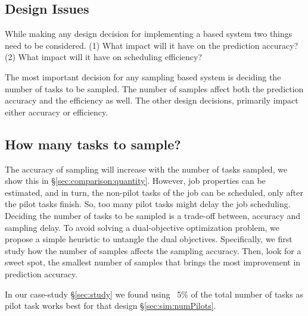 \subsection{Design Issues}
\label{sec:sampling:designissues}

While making any design decision for implementing a \lTechnique based system
two things need to be considered. (1) What impact will it have on the
prediction accuracy?  (2) What impact will it have on scheduling efficiency?

The most important decision for any sampling based system is deciding the
number of tasks to be sampled. The number of samples affect both the prediction
accuracy and the efficiency as well. The other design decisions, primarily
impact either accuracy or efficiency.
%

\subsection{How many tasks to sample?}
\label{sec:sampling:numpilots}
The accuracy of sampling will increase with the number of tasks sampled, we
show this in \S\ref{sec:comparison:quantity}. However, job properties can be
estimated, and in turn, the non-pilot tasks of the job can be scheduled,
only after the pilot tasks finish.  So, too many pilot tasks might delay the job
scheduling. Deciding the number of tasks to be sampled is a trade-off between,
accuracy and sampling delay. To avoid solving a dual-objective optimization
problem, we propose a simple heuristic to untangle the dual objectives.
Specifically, we first study how the number of samples affects the sampling
accuracy. Then, look for a sweet spot, \ie the smallest
number of samples that brings the most improvement in prediction accuracy. 

%
%
In our case-study \S\ref{sec:study} we found using ~5\% of the total number of
tasks as pilot task works best for that design \S\ref{sec:sim:numPilots}.


